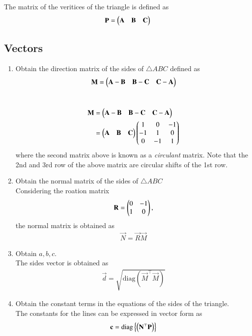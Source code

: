 The matrix of the veritices of the triangle is defined as
		\begin{align}
			\mathbf{P} = \begin{pmatrix}\mathbf{A} & \mathbf{B} &\mathbf{C}\end{pmatrix}
		\end{align}
		\subsection{Vectors}
\begin{enumerate}[label=\thesection.\arabic*.,ref=\thesubsection.\theenumi]
\item Obtain the direction matrix of the sides of $\triangle ABC$
	defined as 
		\begin{align}
		\mathbf{M} = 	\begin{pmatrix}\mathbf{A}-\mathbf{B} & \mathbf{B}-\mathbf{C} & \mathbf{C}-\mathbf{A}\end{pmatrix}
		\end{align}
	\\
		\solution 

		\begin{align}
			\mathbf{M} &= \begin{pmatrix}\mathbf{A}-\mathbf{B} & \mathbf{B}-\mathbf{C} & \mathbf{C}-\mathbf{A}\end{pmatrix}
			\\
			&= 
			\begin{pmatrix}\mathbf{A} & \mathbf{B} &\mathbf{C}\end{pmatrix}
			\begin{pmatrix}1 & 0 & -1 \\ -1 & 1 & 0 \\ 0 & -1 & 1\end{pmatrix}
		\end{align}
		where the second matrix above 
		is known as a {\em circulant} matrix.  Note that the 2nd and 3rd row of the above matrix are circular shifts of the 1st row.
	\item Obtain the normal matrix  of the sides of $\triangle ABC$
		\\
		\solution Considering the roation matrix
		\begin{align}
			\mathbf{R}  = \begin{pmatrix}0 & -1 \\ 1 & 0\end{pmatrix},
		\end{align}
		the normal matrix is obtained as
		\begin{align}
			\vec{N} = \vec{R}\vec{M} 
		\end{align}

	\item Obtain $a, b, c$.
		\\
		\solution The sides vector is obtained as
		\begin{align}
			\vec{d} = \sqrt{\text{diag}(\vec{M}^{\top}\vec{M})}
		\end{align}
	\item Obtain the constant terms in the equations of the sides of the triangle. 
		\\
		\solution The constants for the lines can be expressed in vector form as
		\begin{align}
			\mathbf{c} = \text{diag}\left\{\left(\mathbf{N}^{\top}\mathbf{P}\right)\right\} 
		\end{align}
\end{enumerate}

